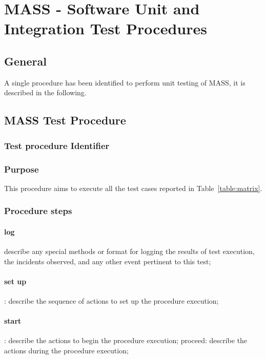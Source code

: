 
\chapter{MASS - Software Unit and Integration Test Procedures}

\section{General}

A single procedure has been identified to perform unit testing of MASS, it is described in the following.

\section{MASS Test Procedure}

\subsection{Test procedure Identifier}




\subsection{Purpose}

This procedure aims to execute all the test cases reported in Table~\ref{table:matrix}.

\subsection{Procedure steps}

\subsubsection{log}
describe any special methods or format for logging the results of test execution, the incidents observed, and any other event pertinent to this test;
\subsubsection{set up}
: describe the sequence of actions to set up the procedure execution;
\subsubsection{start}
: describe the actions to begin the procedure execution; proceed: describe the actions during the procedure execution;
